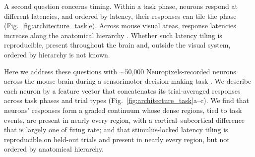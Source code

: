 \documentclass[10pt,lineno]{elife}
\begin{document}
A second question concerns timing. Within a task phase, neurons respond at different latencies, and ordered by latency, their responses can tile the phase (Fig.~\ref{fig:architecture_task}e). Across mouse visual areas, response latencies increase along the anatomical hierarchy \cite{siegle2021survey, harris2019hierarchical}. Whether such latency tiling is reproducible, present throughout the brain and, outside the visual system, ordered by hierarchy is not known.

Here we address these questions with $\sim$50,000 Neuropixels-recorded neurons across the mouse brain during a sensorimotor decision-making task \cite{laboratory2021standardized,international2025brain}. We describe each neuron by a feature vector that concatenates its trial-averaged responses across task phases and trial types (Fig.~\ref{fig:architecture_task}a--c). We find that neurons' responses form a graded continuum whose dense regions, tied to task events, are present in nearly every region, with a cortical--subcortical difference that is largely one of firing rate; and that stimulus-locked latency tiling is reproducible on held-out trials and present in nearly every region, but not ordered by anatomical hierarchy.

\FloatBarrier
\end{document}
